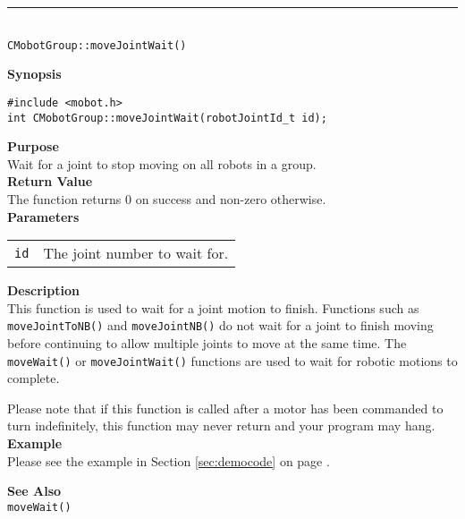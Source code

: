 \noindent
\vspace{5pt}
\rule{4.5in}{0.015in}\\
\noindent
{\LARGE \texttt{CMobotGroup::moveJointWait()}}\\
{}

\noindent
{\bf Synopsis}\\
\begin{verbatim}
#include <mobot.h>
int CMobotGroup::moveJointWait(robotJointId_t id);
\end{verbatim}

\noindent
{\bf Purpose}\\
Wait for a joint to stop moving on all robots in a group.\\

\noindent
{\bf Return Value}\\
The function returns 0 on success and non-zero otherwise.\\

\noindent
{\bf Parameters}
\vspace{-0.1in}
\begin{description}
\item               
\begin{tabular}{p{10 mm}p{145 mm}}
\texttt{id} & The joint number to wait for. \\
\end{tabular}
\end{description}

\noindent
{\bf Description}\\
This function is used to wait for a joint motion to finish. Functions such as
\texttt{moveJointToNB()} and \texttt{moveJointNB()} do not wait for a joint to finish
moving before continuing to allow multiple joints to move at the same time. The
\texttt{moveWait()} or \texttt{moveJointWait()} functions are used to wait for
robotic motions to complete.

Please note that if this function is called after a motor has been commanded to
turn indefinitely, this function may never return and your program may hang.\\

\noindent
{\bf Example}\\
Please see the example in Section \ref{sec:democode} on page \pageref{sec:democode}.\\
\noindent

\noindent
{\bf See Also}\\
\texttt{moveWait()}

